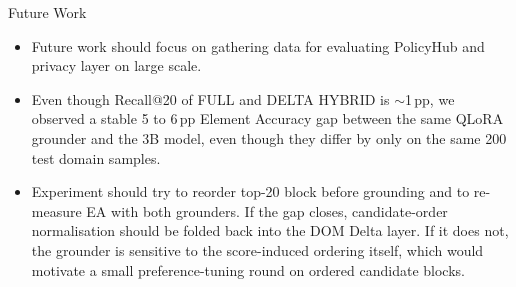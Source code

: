 \begin{frame}{Future Work}
  \begin{itemize}
    \item Future work should focus on gathering data for evaluating PolicyHub and privacy layer on large scale.

    \item Even though Recall@20 of FULL and DELTA HYBRID is $\sim$1\,pp, we observed a stable 5 to 6\,pp Element Accuracy gap between the same QLoRA grounder and the 3B model, even though they differ by only on the same 200 test domain samples.

    \item Experiment should try to reorder top-20 block before grounding and to re-measure EA with both grounders. If the gap closes, candidate-order normalisation should be folded back into the DOM Delta layer. If it does not, the grounder is sensitive to the score-induced ordering itself, which would motivate a small preference-tuning round on ordered candidate blocks.
  \end{itemize}
\end{frame}
